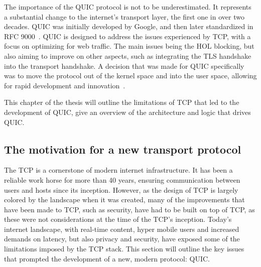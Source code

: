 \documentclass[english, 12pt, a4paper, elec, utf8, a-2b, online]{aaltothesis}
\begin{document}
The importance of the QUIC protocol is not to be underestimated. It represents
a substantial change to the internet's transport layer, the first one in over
two decades. QUIC was initially developed by Google, and then later standardized
in RFC 9000~\cite{rfc9000}. QUIC is designed to address the issues experienced
by TCP, with a focus on optimizing for web traffic. The main issues being the
HOL blocking, but also aiming to improve on other aspects,
such as integrating the TLS handshake into the transport handshake. A decision
that was made for QUIC specifically was to move the protocol out of the kernel
space and into the user space, allowing for rapid development and innovation~\cite{quic_transport_protocol_design}.

This chapter of the thesis will outline the limitations of TCP that led to the
development of QUIC, give an overview of the architecture and logic that drives
QUIC.
\subsection{The motivation for a new transport protocol \label{quic_motivation}}
The TCP is a cornerstone of modern internet infrastructure. It has been a reliable
work horse for more than 40 years, ensuring communication between users and hosts
since its inception. However, as the design of TCP is largely colored by the
landscape when it was created, many of the improvements that have been made to TCP,
such as security, have had to be built on top of TCP, as these were not considerations
at the time of the TCP's inception. Today's internet landscape, with real-time content,
hyper mobile users and increased demands on latency, but also privacy and security, have exposed
some of the limitations imposed by the TCP stack. This section will outline the
key issues that prompted the development of a new, modern protocol: QUIC.
\end{document}
